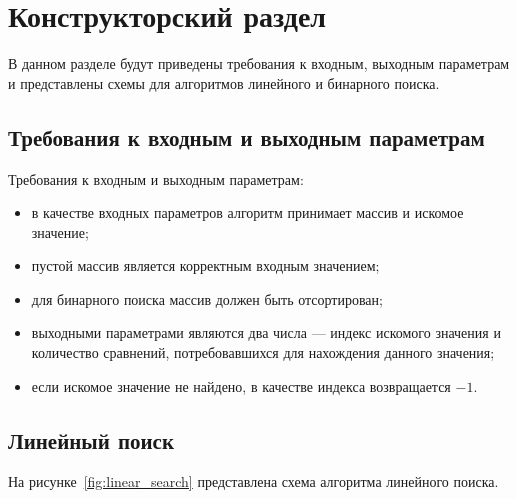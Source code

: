 \chapter{Конструкторский раздел}

В данном разделе будут приведены требования к входным, выходным параметрам и представлены схемы для алгоритмов линейного и бинарного поиска.

\section{Требования к входным и выходным параметрам}

Требования к входным и выходным параметрам:
\begin{itemize}[label=--]
    \item в качестве входных параметров алгоритм принимает массив и искомое значение;
    \item пустой массив является корректным входным значением;
    \item для бинарного поиска массив должен быть отсортирован;
    \item выходными параметрами являются два числа --- индекс искомого значения и количество сравнений, потребовавшихся для нахождения данного значения;
    \item если искомое значение не найдено, в качестве индекса возвращается $-1$.
\end{itemize}

\section{Линейный поиск}

На рисунке~\ref{fig:linear_search} представлена схема алгоритма линейного поиска.


